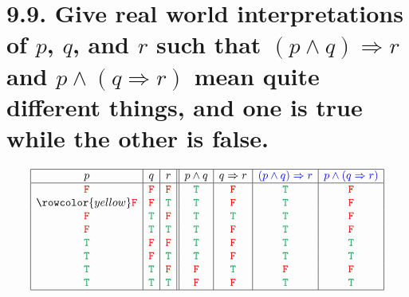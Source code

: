 \documentclass{article}
\begin{document}
\section*{9.9. Give real world interpretations of $p$, $q$, and $r$ such that $(p\land q)\Rightarrow r$ and $p\land(q\Rightarrow r)$ mean quite different things, and one is true while the other is false.}
\[\begin{array}{|c|c|c||c|c|c|c|}
\hline
p&q&r&p\land q&q\Rightarrow r&\textcolor{blue}{(p\land q)\Rightarrow r}&\textcolor{blue}{p\land(q\Rightarrow r)}\\
\hline
\textcolor{red}{\tt{F}}&\textcolor{red}{\tt{F}}&\textcolor{red}{\tt{F}}&\textcolor{ForestGreen}{\tt{T}}&\textcolor{red}{\tt{F}}&\textcolor{ForestGreen}{\tt{T}}&\textcolor{red}{\tt{F}}\\
\rowcolor{yellow}\textcolor{red}{\tt{F}}&\textcolor{red}{\tt{F}}&\textcolor{ForestGreen}{\tt{T}}&\textcolor{ForestGreen}{\tt{T}}&\textcolor{red}{\tt{F}}&\textcolor{ForestGreen}{\tt{T}}&\textcolor{red}{\tt{F}}\\
\textcolor{red}{\tt{F}}&\textcolor{ForestGreen}{\tt{T}}&\textcolor{red}{\tt{F}}&\textcolor{ForestGreen}{\tt{T}}&\textcolor{ForestGreen}{\tt{T}}&\textcolor{ForestGreen}{\tt{T}}&\textcolor{red}{\tt{F}}\\
\textcolor{red}{\tt{F}}&\textcolor{ForestGreen}{\tt{T}}&\textcolor{ForestGreen}{\tt{T}}&\textcolor{ForestGreen}{\tt{T}}&\textcolor{red}{\tt{F}}&\textcolor{ForestGreen}{\tt{T}}&\textcolor{red}{\tt{F}}\\
\textcolor{ForestGreen}{\tt{T}}&\textcolor{red}{\tt{F}}&\textcolor{red}{\tt{F}}&\textcolor{ForestGreen}{\tt{T}}&\textcolor{red}{\tt{F}}&\textcolor{ForestGreen}{\tt{T}}&\textcolor{ForestGreen}{\tt{T}}\\
\textcolor{ForestGreen}{\tt{T}}&\textcolor{red}{\tt{F}}&\textcolor{ForestGreen}{\tt{T}}&\textcolor{ForestGreen}{\tt{T}}&\textcolor{red}{\tt{F}}&\textcolor{ForestGreen}{\tt{T}}&\textcolor{ForestGreen}{\tt{T}}\\
\textcolor{ForestGreen}{\tt{T}}&\textcolor{ForestGreen}{\tt{T}}&\textcolor{red}{\tt{F}}&\textcolor{red}{\tt{F}}&\textcolor{ForestGreen}{\tt{T}}&\textcolor{red}{\tt{F}}&\textcolor{red}{\tt{F}}\\
\textcolor{ForestGreen}{\tt{T}}&\textcolor{ForestGreen}{\tt{T}}&\textcolor{ForestGreen}{\tt{T}}&\textcolor{red}{\tt{F}}&\textcolor{red}{\tt{F}}&\textcolor{ForestGreen}{\tt{T}}&\textcolor{ForestGreen}{\tt{T}}\\
\hline
\end{array}\]
\end{document}
